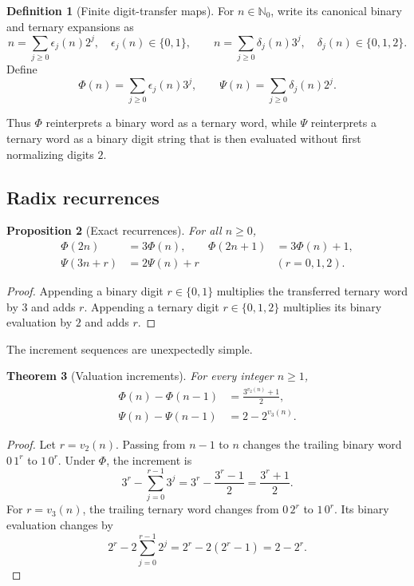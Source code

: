 \documentclass[11pt]{article}
\newtheorem{theorem}{Theorem}[section]
\newtheorem{proposition}[theorem]{Proposition}
\theoremstyle{definition}
\newtheorem{definition}[theorem]{Definition}
\newcommand{\N}{\mathbb N}
\begin{document}
\begin{definition}[Finite digit-transfer maps]\label{def:maps}
For \(n\in\N_0\), write its canonical binary and ternary expansions as
\[
 n=\sum_{j\ge0}\epsilon_j(n)2^j,
 \quad \epsilon_j(n)\in\{0,1\},
 \qquad
 n=\sum_{j\ge0}\delta_j(n)3^j,
 \quad \delta_j(n)\in\{0,1,2\}.
\]
Define
\begin{equation}\label{eq:PhiPsi-def}
 \Phi(n)=\sum_{j\ge0}\epsilon_j(n)3^j,
 \qquad
 \Psi(n)=\sum_{j\ge0}\delta_j(n)2^j.
\end{equation}
\end{definition}

Thus \(\Phi\) reinterprets a binary word as a ternary word, while \(\Psi\)
reinterprets a ternary word as a binary digit string that is then evaluated
without first normalizing digits \(2\).

\subsection{Radix recurrences}

\begin{proposition}[Exact recurrences]\label{prop:recurrences}
For all \(n\ge0\),
\begin{align}
 \Phi(2n)&=3\Phi(n),
 &\Phi(2n+1)&=3\Phi(n)+1,\label{eq:Phi-rec}\\
 \Psi(3n+r)&=2\Psi(n)+r
 &&(r=0,1,2).\label{eq:Psi-rec}
\end{align}
\end{proposition}

\begin{proof}
Appending a binary digit \(r\in\{0,1\}\) multiplies the transferred ternary
word by \(3\) and adds \(r\).  Appending a ternary digit
\(r\in\{0,1,2\}\) multiplies its binary evaluation by \(2\) and adds \(r\).
\end{proof}

The increment sequences are unexpectedly simple.

\begin{theorem}[Valuation increments]\label{thm:increments}
For every integer \(n\ge1\),
\begin{align}
 \Phi(n)-\Phi(n-1)
   &=\frac{3^{v_2(n)}+1}{2},\label{eq:Phi-inc}\\
 \Psi(n)-\Psi(n-1)
   &=2-2^{v_3(n)}.\label{eq:Psi-inc}
\end{align}
\end{theorem}

\begin{proof}
Let \(r=v_2(n)\).  Passing from \(n-1\) to \(n\) changes the trailing binary
word \(0\,1^r\) to \(1\,0^r\).  Under \(\Phi\), the increment is
\[
  3^r-\sum_{j=0}^{r-1}3^j
  =3^r-\frac{3^r-1}{2}
  =\frac{3^r+1}{2}.
\]
For \(r=v_3(n)\), the trailing ternary word changes from
\(0\,2^r\) to \(1\,0^r\).  Its binary evaluation changes by
\[
  2^r-2\sum_{j=0}^{r-1}2^j
  =2^r-2(2^r-1)
  =2-2^r.
\]
\end{proof}
\end{document}
